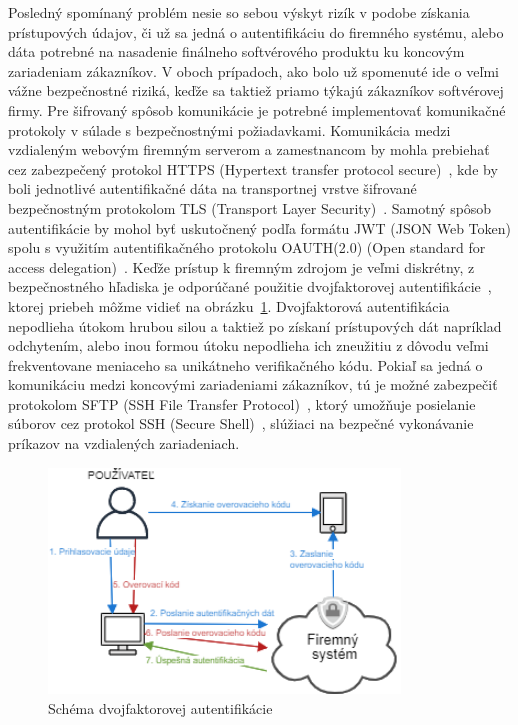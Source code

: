 Posledný spomínaný problém nesie so sebou výskyt rizík v podobe získania prístupových údajov, či už sa jedná o autentifikáciu
do firemného systému, alebo dáta potrebné na nasadenie finálneho softvérového produktu ku koncovým zariadeniam zákazníkov.
V oboch prípadoch, ako bolo už spomenuté ide o veľmi vážne bezpečnostné riziká, keďže sa taktiež priamo týkajú zákazníkov
softvérovej firmy.
Pre šifrovaný spôsob komunikácie je potrebné implementovať komunikačné protokoly v súlade s bezpečnostnými požiadavkami.
Komunikácia medzi vzdialeným webovým firemným serverom a zamestnancom by mohla prebiehať cez zabezpečený protokol
HTTPS (Hypertext transfer protocol secure)~\cite{HTTPS}, kde by boli jednotlivé autentifikačné dáta na transportnej vrstve
šifrované bezpečnostným protokolom TLS (Transport Layer Security)~\cite{TLS}.
Samotný spôsob autentifikácie by mohol byť uskutočnený podľa formátu JWT (JSON Web Token) spolu s využitím autentifikačného
protokolu OAUTH(2.0) (Open standard for access delegation)~\cite{JWT}.
Keďže prístup k firemným zdrojom je veľmi diskrétny, z bezpečnostného hľadiska je odporúčané použitie dvojfaktorovej
autentifikácie~\cite{DvojfaktorovaAutentifikacia}, ktorej priebeh môžme vidieť na obrázku~\ref{fig:obr_6}.
Dvojfaktorová autentifikácia nepodlieha útokom hrubou silou a taktiež po získaní prístupových dát napríklad odchytením,
alebo inou formou útoku nepodlieha ich zneužitiu z dôvodu veľmi frekventovane meniaceho sa unikátneho verifikačného kódu.
Pokiaľ sa jedná o komunikáciu medzi koncovými zariadeniami zákazníkov, tú je možné zabezpečiť protokolom SFTP (SSH File
Transfer Protocol)~\cite{SFTP}, ktorý umožňuje posielanie súborov cez protokol SSH (Secure Shell)~\cite{SSH}, slúžiaci
na bezpečné vykonávanie príkazov na vzdialených zariadeniach.

\begin{figure}[H]
\begin{center}\includegraphics[width=\textwidth,height=6cm,keepaspectratio=true]{assets/auth.png}\end{center}
\caption[Schéma dvojfaktorovej autentifikácie]{Schéma dvojfaktorovej autentifikácie}\label{fig:obr_6}
\end{figure}

